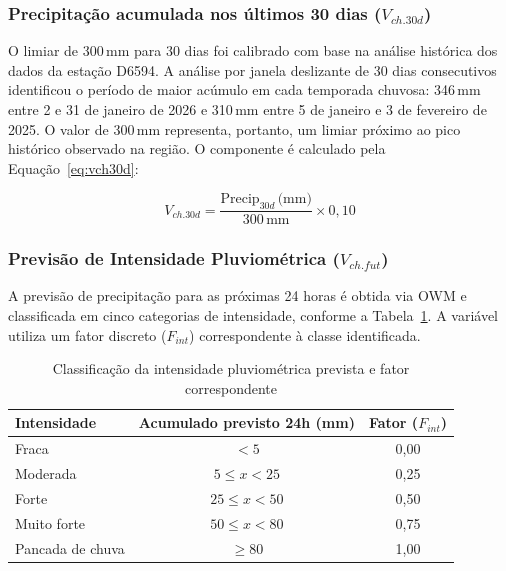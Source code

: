 \subsubsection{Precipitação acumulada nos últimos 30 dias (\texorpdfstring{$V_{ch.30d}$}{V\_ch.30d})}

O limiar de 300\,mm para 30 dias foi calibrado com base na análise
histórica dos dados da estação D6594. A análise por janela deslizante
de 30 dias consecutivos identificou o período de maior acúmulo em
cada temporada chuvosa: 346\,mm entre 2 e 31 de janeiro de 2026 e
310\,mm entre 5 de janeiro e 3 de fevereiro de 2025. O valor de
300\,mm representa, portanto, um limiar próximo ao pico histórico
observado na região. O componente é calculado pela
Equação~\ref{eq:vch30d}:

\begin{equation}
\label{eq:vch30d}
V_{ch.30d} = \frac{\text{Precip}_{30d}\,\text{(mm)}}{300\,\text{mm}}
             \times 0{,}10
\end{equation}

\subsubsection{Previsão de Intensidade Pluviométrica (\texorpdfstring{$V_{ch.fut}$}{V\_ch.fut})}

A previsão de precipitação para as próximas 24 horas é obtida via
OWM e classificada em cinco categorias de intensidade, conforme a
Tabela~\ref{tab:intensidade}. A variável utiliza um fator discreto
($F_{int}$) correspondente à classe identificada.

\begin{table}[htb]
\centering
\caption{Classificação da intensidade pluviométrica prevista e fator correspondente}
\label{tab:intensidade}
\begin{tabular}{lcc}
\hline
\textbf{Intensidade}     & \textbf{Acumulado previsto 24h (mm)} & \textbf{Fator ($F_{int}$)} \\
\hline
Fraca                    & $< 5$                                & 0,00                       \\
Moderada                 & $5 \leq x < 25$                      & 0,25                       \\
Forte                    & $25 \leq x < 50$                     & 0,50                       \\
Muito forte              & $50 \leq x < 80$                     & 0,75                       \\
Pancada de chuva         & $\geq 80$                            & 1,00                       \\
\hline
\end{tabular}
\end{table}


